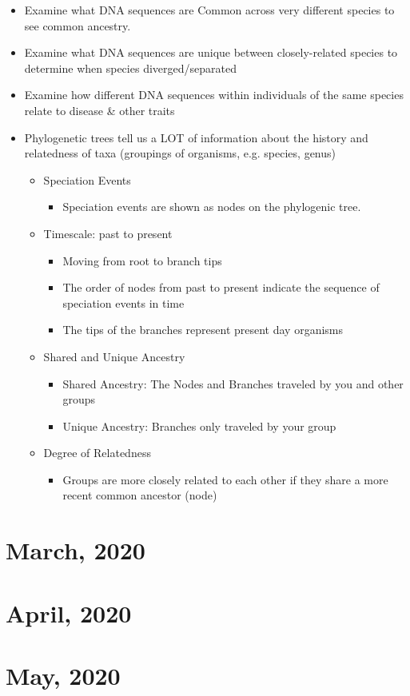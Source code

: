 \documentclass[10pt, oneside]{article}
\begin{document}
\begin{itemize}

\item Examine what DNA sequences are Common across very different species to see common ancestry.
\item Examine what DNA sequences are unique between closely-related species to determine when species diverged/separated
\item Examine how different DNA sequences within individuals of the same species relate to disease \& other traits
\item Phylogenetic trees tell us a LOT of information about the history and relatedness of taxa (groupings of organisms, e.g. species, genus)
\begin{itemize}
\item Speciation Events
\begin{itemize}
\item Speciation events are shown as nodes on the phylogenic tree.
\end{itemize}
\item Timescale: past to present
\begin{itemize}
\item Moving from root to branch tips
\item The order of nodes from past to present indicate the sequence of speciation events in time
\item The tips of the branches represent present day organisms
\end{itemize}
\item Shared and Unique Ancestry
\begin{itemize}
\item Shared Ancestry: The Nodes and Branches traveled by you and other groups
\item Unique Ancestry: Branches only traveled by your group
\end{itemize}
\item Degree of Relatedness
\begin{itemize}
\item Groups are more closely related to each other if they share a more recent common ancestor (node)
\end{itemize}
\end{itemize}
\end{itemize}


\section{March, 2020}

\section{April, 2020}

\section{May, 2020}
\end{document}
